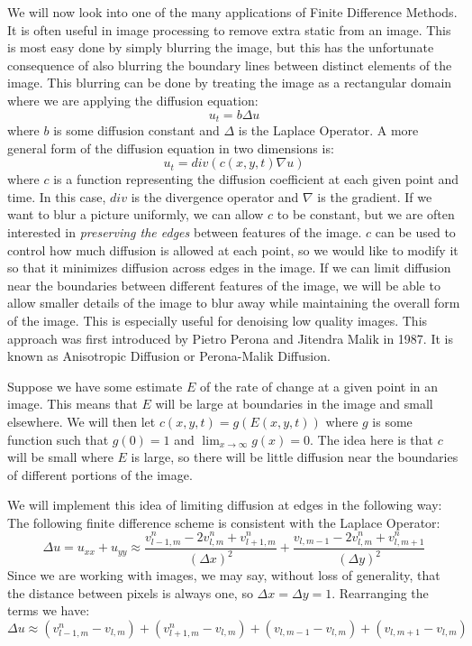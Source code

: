 \label{lab:AnisotropicDiffusion}


We will now look into one of the many applications of Finite Difference Methods.
It is often useful in image processing to remove extra static from an image.
This is most easy done by simply blurring the image, but this has the unfortunate consequence of also blurring the boundary lines between distinct elements of the image.
This blurring can be done by treating the image as a rectangular domain where we are applying the diffusion equation:
$$u_t = b \Delta u$$
where $b$ is some diffusion constant and $\Delta$ is the Laplace Operator.
A more general form of the diffusion equation in two dimensions is:
$$u_t = div \left( c(x,y,t) \nabla u \right)$$
where $c$ is a function representing the diffusion coefficient at each given point and time.
In this case, $div$ is the divergence operator and $\nabla$ is the gradient.
If we want to blur a picture uniformly, we can allow $c$ to be constant, but we are often interested in \textit{preserving the edges} between features of the image.
$c$ can be used to control how much diffusion is allowed at each point, so we would like to modify it so that it minimizes diffusion across edges in the image.
If we can limit diffusion near the boundaries between different features of the image, we will be able to allow smaller details of the image to blur away while maintaining the overall form of the image.
This is especially useful for denoising low quality images. 
This approach was first introduced by Pietro Perona and Jitendra Malik in 1987.
It is known as Anisotropic Diffusion or Perona-Malik Diffusion.

Suppose we have some estimate $E$ of the rate of change at a given point in an image.
This means that $E$ will be large at boundaries in the image and small elsewhere.
We will then let $c(x,y,t) = g(E(x,y,t))$ where $g$ is some function such that $g(0)=1$ and $\displaystyle{\lim_{x \to \infty} g(x) = 0}$. 
The idea here is that $c$ will be small where $E$ is large, so there will be little diffusion near the boundaries of different portions of the image.

We will implement this idea of limiting diffusion at edges in the following way:
The following finite difference scheme is consistent with the Laplace Operator:
$$\Delta u = u_{xx}+u_{yy} \approx \frac{v_{l-1,m}^n - 2 v_{l,m}^n + v_{l+1,m}^n}{(\Delta x)^2} + \frac{v_{l,m-1}-2 v_{l,m}^n + v_{l,m+1}^n}{(\Delta y)^2}$$
Since we are working with images, we may say, without loss of generality, that the distance between pixels is always one, so $\Delta x = \Delta y = 1$. Rearranging the terms we have:
$$ \Delta u \approx (v_{l-1,m}^n - v_{l,m}) + (v_{l+1,m}^n - v_{l,m}) + (v_{l,m-1} - v_{l,m}) + (v_{l,m+1} - v_{l,m})$$

